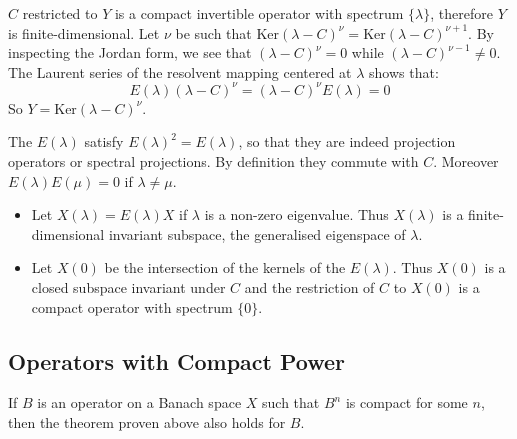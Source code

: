 \documentclass{article}
\theoremstyle{definition}
\begin{document}
$C$ restricted to $Y$ is a compact invertible operator with spectrum $\{\lambda\}$, therefore $Y$ is finite-dimensional. Let $\nu$ be such that $\text{Ker}(\lambda - C)^\nu = \text{Ker}(\lambda - C)^{\nu+1}$. By inspecting the Jordan form, we see that $(\lambda - C)^\nu = 0$ while $(\lambda - C)^{\nu-1} \neq 0$. The Laurent series of the resolvent mapping centered at $\lambda$ shows that:
\[E(\lambda)(\lambda - C)^\nu = (\lambda - C)^\nu E(\lambda) = 0\]
So $Y = \text{Ker}(\lambda - C)^\nu$.

The $E(\lambda)$ satisfy $E(\lambda)^2 = E(\lambda)$, so that they are indeed projection operators or spectral projections. By definition they commute with $C$. Moreover $E(\lambda)E(\mu) = 0$ if $\lambda \neq \mu$.

\begin{itemize}
\item Let $X(\lambda) = E(\lambda)X$ if $\lambda$ is a non-zero eigenvalue. Thus $X(\lambda)$ is a finite-dimensional invariant subspace, the generalised eigenspace of $\lambda$.
\item Let $X(0)$ be the intersection of the kernels of the $E(\lambda)$. Thus $X(0)$ is a closed subspace invariant under $C$ and the restriction of $C$ to $X(0)$ is a compact operator with spectrum $\{0\}$.
\end{itemize}

\subsection{Operators with Compact Power}
If $B$ is an operator on a Banach space $X$ such that $B^n$ is compact for some $n$, then the theorem proven above also holds for $B$.
\end{document}
